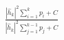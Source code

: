 \documentclass[preview]{standalone}
\begin{document}
\begin{align*}
\frac{\left|{\hat{h}_k}\right|^2\sum_{i=1}^{k}p_i+ C}{\left|{\hat{h}_k}\right|^2\sum_{j=1}^{k-1}p_j+ C}
\end{align*}
\end{document}
